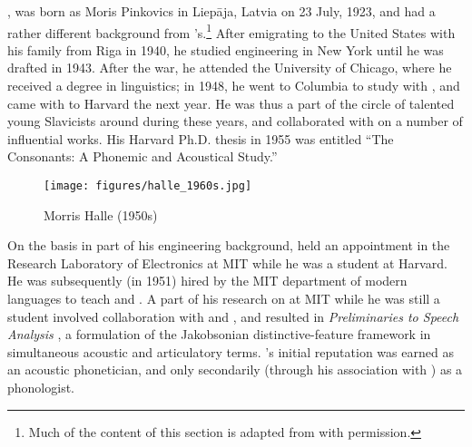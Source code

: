 , was born as Moris Pinkovics in Liepāja, Latvia on 23
July, 1923, and had a rather different background from
{\Chomsky}'s.\footnote{Much of the content of this section is adapted
  from \citealt{sra00:royaumont} with permission.}  After emigrating
to the United States with his family from Riga in 1940, he studied
engineering in New York until he was drafted in 1943. After the war,
he attended the University of Chicago, where he received a degree in
linguistics; in 1948, he went to Columbia to study with {\Jakobson}, and
came with {\Jakobson} to Harvard the next year. He was thus a part of the
circle of talented young Slavicists around {\Jakobson} during these
years, and collaborated with {\Jakobson} on a number of influential
works. His Harvard Ph.D. thesis in 1955 was entitled ``The 
Consonants: A Phonemic and Acoustical Study.''

\begin{wrapfigure}[13]{l}{.35\textwidth}
  \texttt{[image: figures/halle\_1960s.jpg]}
  \caption{Morris Halle (1950s)}
  \label{fig:ch.genphon.halle_1960s}
\end{wrapfigure}
On the basis in part of his engineering background, {\Halle} held an
appointment in the Research Laboratory of Electronics at MIT while he
was a student at Harvard. He was subsequently (in 1951) hired by the
MIT department of modern languages to teach  and .  A
part of his research on  at MIT while he was still a student
involved collaboration with {\Jakobson} and , and resulted in
\textsl{Preliminaries to Speech Analysis}
\citep{jakobson.fant.halle52:preliminaries}, a formulation of the
Jakobsonian distinctive-feature framework in simultaneous acoustic and
articulatory terms. {\Halle}'s initial reputation was earned as an
acoustic phonetician, and only secondarily (through his association
with {\Jakobson}) as a phonologist.

